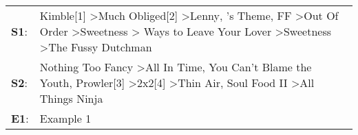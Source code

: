\begin{supertabular}{p{0.03\textwidth}p{0.92\textwidth}}
 \textbf{S1}:  &  Kimble[1]\textsuperscript{} \textgreater \enspace Much Obliged[2]\textsuperscript{} \textgreater \enspace Lenny\textsuperscript{}, 's Theme\textsuperscript{}, \enspace FF\textsuperscript{} \textgreater \enspace Out Of Order\textsuperscript{} \textgreater \enspace Sweetness\textsuperscript{} \textgreater {} Ways to Leave Your Lover\textsuperscript{} \textgreater \enspace Sweetness\textsuperscript{} \textgreater \enspace The Fussy Dutchman\textsuperscript{}  \enspace  \\
 \textbf{S2}:  &                                                                                                           Nothing Too Fancy\textsuperscript{} \textgreater \enspace All In Time\textsuperscript{}, \enspace You Can't Blame the Youth\textsuperscript{}, \enspace Prowler[3]\textsuperscript{} \textgreater \enspace 2x2[4]\textsuperscript{} \textgreater \enspace Thin Air\textsuperscript{}, \enspace Soul Food II\textsuperscript{} \textgreater \enspace All Things Ninja\textsuperscript{}  \enspace  \\
 \textbf{E1}:  &                                                                                                                                                                                                                                                                                                                                                                                                                                                                      Example 1\textsuperscript{}  \enspace  \\
\end{supertabular}
